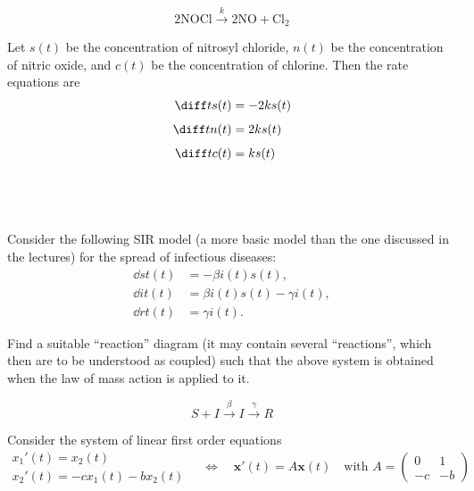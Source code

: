 \documentclass[a4paper]{article}
\begin{document}
\[ 2\text{NOCl} \xrightarrow{\ k\ } 2\text{NO} + \text{Cl}_2 \]

Let $s(t)$ be the concentration of nitrosyl chloride, $n(t)$ be the concentration of nitric oxide, and $c(t)$ be the concentration of chlorine. Then the rate equations are \begin{align*}
    \diff t s(t) &= -2ks(t) \\[1ex]
    \diff t n(t) &= 2ks(t) \\[1ex]
    \diff t c(t) &= ks(t)
\end{align*}

\newpage
\subsection{~} %

\begin{questionbody}
Consider the following SIR model (a more basic model than the one discussed in the
lectures) for the spread of infectious diseases: \begin{align*}
\dd st (t) &= -\beta i(t) s(t), \\
\dd it (t) &= \beta i(t) s(t) - \gamma i(t), \\
\dd rt (t) &= \gamma i(t).
\end{align*}

Find a suitable \enquote{reaction} diagram (it may contain several \enquote{reactions}, which then are to be understood as coupled) such that the above system is obtained when the law of mass action is applied to it.
\end{questionbody}

\[ S + I \xrightarrow{\ \beta\ } I \xrightarrow{\ \gamma\ } R \]


\begin{questionbody}
Consider the system of linear first order equations \begin{equation*}
\begin{array}{l}
x_1'(t) = x_2(t) \\[0.5ex]
x_2'(t) = -c x_1(t) - b x_2(t)
\end{array}
\quad \Leftrightarrow \quad
\mathbf{x}'(t) = A \mathbf{x}(t) \quad\text{with } A = \begin{pmatrix} 0 & 1 \\ -c & -b \end{pmatrix}
\end{equation*}
\end{questionbody}
\end{document}
